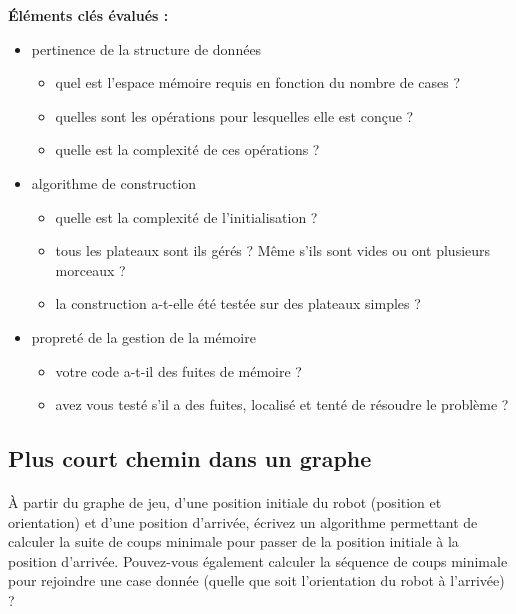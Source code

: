 \documentclass[a4paper]{article}
\begin{document}
\vspace{3mm}
\noindent\textbf{Éléments clés évalués : }
\begin{itemize}
  \item pertinence de la structure de données
    \begin{itemize}
      \item quel est l'espace mémoire requis en fonction du nombre de cases ?
      \item quelles sont les opérations pour lesquelles elle est conçue ?
      \item quelle est la complexité de ces opérations ?
    \end{itemize}
  \item algorithme de construction
    \begin{itemize}
      \item quelle est la complexité de l'initialisation ?
      \item tous les plateaux sont ils gérés ? 
        Même s'ils sont vides ou ont plusieurs morceaux ?
      \item la construction a-t-elle été testée sur des plateaux simples ?
    \end{itemize}
  \item propreté de la gestion de la mémoire
    \begin{itemize}
      \item votre code a-t-il des fuites de mémoire ?
      \item avez vous testé s'il a des fuites, 
        localisé et tenté de résoudre le problème ?
    \end{itemize}
\end{itemize}

\subsection{Plus court chemin dans un graphe}

\paragraph{}À partir du graphe de jeu, d'une position initiale du robot
(position et orientation) et d'une position d'arrivée, écrivez un algorithme
permettant de calculer la suite de coups minimale pour passer de la position
initiale à la position d'arrivée. Pouvez-vous également calculer la séquence de
coups minimale pour rejoindre une case donnée (quelle que soit l'orientation du
robot à l'arrivée) ?
\end{document}
